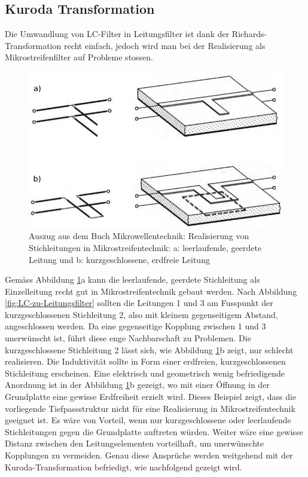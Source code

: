 \subsection{Kuroda Transformation}

Die   Umwandlung   von   LC-Filter   in   Leitungsfilter    ist    dank    der
Richards-Transformation recht einfach, jedoch  wird  man  bei der Realisierung
als Mikrostreifenfilter auf Probleme stossen.

\begin{figure}[h!]
    \centering
    \includegraphics[width=\imagewidth]{images/mikrostreifen}
    \caption{Auszug aus dem Buch Mikrowellentechnik\cite[p.~27]{ref:baechtold}: Realisierung von Stichleitungen in Mikrostreifentechnik: a: leerlaufende, geerdete Leitung und b: kurzgeschlossene, erdfreie Leitung}
    \label{fig:mikrostreifen}
\end{figure}

Gem\"ass Abbildung \ref{fig:mikrostreifen}a  kann  die  leerlaufende, geerdete
Stichleitung  als  Einzelleitung  recht  gut  in  Mikrostreifentechnik  gebaut
werden.  Nach Abbildung \ref{fig:LC-zu-Leitungsfilter} sollten die Leitungen 1
und 3 am Fusspunkt  der  kurzgeschlossenen  Stichleitung  2,  also mit kleinem
gegenseitigem  Abstand, angeschlossen werden. Da  eine  gegenseitige  Kopplung
zwischen  1  und  3  unerw\"unscht  ist,  f\"uhrt diese enge Nachbarschaft  zu
Problemen.  Die  kurzgeschlossene  Stichleitung  2 l\"asst sich, wie Abbildung
\ref{fig:mikrostreifen}b zeigt, nur schlecht realisieren.  Die  Induktivit\"at
sollte  in  Form  einer  erdfreien, kurzgeschlossenen Stichleitung erscheinen.
Eine  elektrisch  und  geometrisch  wenig  befriedigende  Anordnung ist in der
Abbildung \ref{fig:mikrostreifen}b  gezeigt,  wo  mit  einer  \"Offnung in der
Grundplatte eine gewisse Erdfreiheit erzielt wird. Dieses Beispiel zeigt, dass
die   vorliegende   Tiefpassstruktur   nicht   f\"ur  eine   Realisierung   in
Mikrostreifentechnik   geeignet  ist.  Es  w\"are  von   Vorteil,   wenn   nur
kurzgeschlossene  oder  leerlaufende  Stichleitungen  gegen   die  Grundplatte
auftreten  w\"urden.  Weiter   w\"are   eine   gewisse  Distanz  zwischen  den
Leitungselementen  vorteilhaft,  um  unerw\"unschte  Kopplungen zu  vermeiden.
Genau  diese  Anspr\"uche  werden  weitgehend  mit  der  Kuroda-Transformation
befriedigt, wie nachfolgend gezeigt wird.

